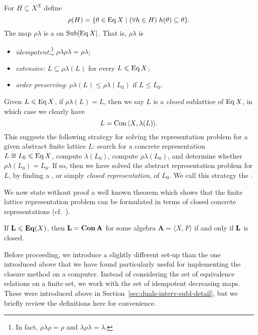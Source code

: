 For $H\subseteq X^X$ define
\[
\rho(H) = \{\theta \in \operatorname{Eq} X \mid   (\forall h\in H) \; h(\theta) \subseteq \theta\}.
\]
The map $\rho \lambda$ is a  on $\operatorname{Sub}[\operatorname{Eq} X]$.
That is, $\rho \lambda$ is
\begin{itemize}
\item \emph{idempotent:}\footnote{In fact, $\rho \lambda \rho = \rho$ and 
  $\lambda \rho \lambda = \lambda$.} $\rho \lambda \rho \lambda = \rho \lambda$;
\item \emph{extensive:} $L \subseteq \rho \lambda (L)$ for every $L \leqslant \operatorname{Eq} X$;
\item \emph{order preserving:} $\rho \lambda (L) \leq \rho \lambda (L_0)$ if $L \leq L_0$.
\end{itemize}
Given $L\leqslant \operatorname{Eq} X$, if $\rho\lambda(L) = L$, then we say $L$ is a 
\emph{closed} sublattice of $\operatorname{Eq} X$, in which case we clearly have
\[L = \operatorname{Con\,} \langle X, \lambda(L)\rangle.\]
This suggests the following strategy for solving the representation problem for a
given abstract finite lattice $L$: search for a concrete representation $L \cong
L_0\leqslant \operatorname{Eq} X$,
compute $\lambda(L_0)$, compute $\rho\lambda(L_0)$, and determine whether 
$\rho\lambda(L_0) = L_0$.  If so, then we have solved the abstract representation
problem for $L$, by finding a , or simply
\emph{closed representation}, of $L_0$.  We call this strategy the .

We now state without proof a well known theorem which shows that the finite lattice
representation problem can be formulated in terms of closed concrete
representations (cf.~\cite{Jonsson:1972}).
\begin{theorem}\label{Concrete-thm-3}
  If $\mathbf{L} \leqslant \mathbf{Eq}(X)$, then $\mathbf{L}= \mathbf{Con\,}\mathbf{A}$ for some algebra 
  $\mathbf{A} = \langle X, F\rangle$ if and only if $\mathbf{L}$ is closed.
\end{theorem}

Before proceeding, we introduce a slightly different set-up than the
one introduced above that we have found particularly useful
for implementing the closure method on a computer. Instead of considering the
set of equivalence relations on a finite set, we work with the set of idempotent
decreasing maps.  These were introduced above in
Section~\ref{sec:duals-interv-subl-detail}, but we briefly review the definitions here
for convenience.


